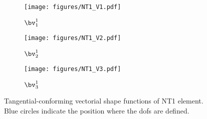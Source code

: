 \begin{figure}[ht]
     \begin{subfigure}[b]{0.32\textwidth}
         \centering
         \texttt{[image: figures/NT1\_V1.pdf]}
        \caption{$\bv^1_1$}
     \end{subfigure}
     \begin{subfigure}[b]{0.32\textwidth}
         \centering
         \texttt{[image: figures/NT1\_V2.pdf]}
  \caption{$\bv^1_2$}
     \end{subfigure}
          \begin{subfigure}[b]{0.32\textwidth}
         \centering
         \texttt{[image: figures/NT1\_V3.pdf]}
  \caption{$\bv^1_3$}
     \end{subfigure}
        \caption{Tangential-conforming vectorial shape functions of NT1 element. Blue circles indicate the position where the dofs are defined. }
        \label{Fig:shape_function_NT1}
\end{figure}


